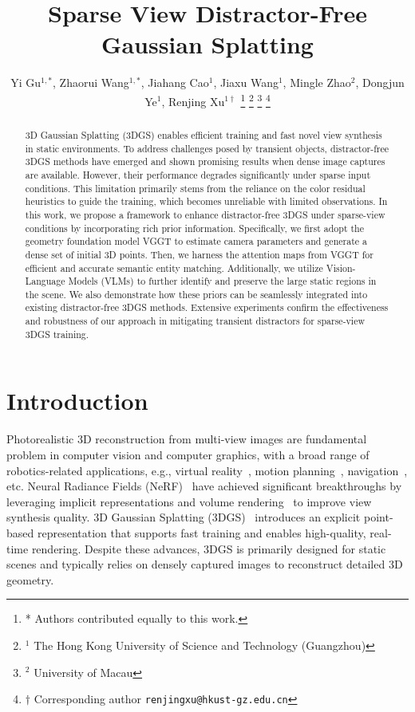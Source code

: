 \documentclass[letterpaper, 10 pt, conference]{ieeeconf}  %
\title{\LARGE \bf
Sparse View Distractor-Free Gaussian Splatting
}
\author{Yi Gu$^{1,*}$, Zhaorui Wang$^{1,*}$,  Jiahang Cao$^{1}$, Jiaxu Wang$^{1}$, Mingle Zhao$^{2}$, Dongjun Ye$^{1}$, Renjing Xu$^{1 \dagger}$ %
\thanks{* Authors contributed equally to this work.}%
\thanks{$^{1}$ The Hong Kong University of Science and Technology (Guangzhou)}%
\thanks{$^{2}$ University of Macau}%
\thanks{$\dagger$ Corresponding author
        {\tt\small renjingxu@hkust-gz.edu.cn}}%
}
\begin{document}
\maketitle
\thispagestyle{empty}
\pagestyle{empty}


\begin{abstract}
3D Gaussian Splatting (3DGS) enables efficient training and fast novel view synthesis in static environments. To address challenges posed by transient objects, distractor-free 3DGS methods have emerged and shown promising results when dense image captures are available. However, their performance degrades significantly under sparse input conditions. This limitation primarily stems from the reliance on the color residual heuristics to guide the training, which becomes unreliable with limited observations. In this work, we propose a framework to enhance distractor-free 3DGS under sparse-view conditions by incorporating rich prior information. Specifically, we first adopt the geometry foundation model VGGT to estimate camera parameters and generate a dense set of initial 3D points. Then, we harness the attention maps from VGGT for efficient and accurate semantic entity matching. Additionally, we utilize Vision-Language Models (VLMs) to further identify and preserve the large static regions in the scene. We also demonstrate how these priors can be seamlessly integrated into existing distractor-free 3DGS methods. Extensive experiments confirm the effectiveness and robustness of our approach in mitigating transient distractors for sparse-view 3DGS training.
\end{abstract}


\section{Introduction}
\label{introduction}


Photorealistic 3D reconstruction from multi-view images are fundamental problem in computer vision and computer graphics, with a broad range of robotics-related applications, e.g., virtual reality~\cite{zhu2025vr}, motion planning~\cite{xu2024hgs,liu2025physics,jin2024gs}, navigation~\cite{yamazaki2024open,jun2024renderable}, etc. Neural Radiance Fields (NeRF)~\cite{mildenhall2021nerf} have achieved significant breakthroughs by leveraging implicit representations and volume rendering~\cite{max2002optical} to improve view synthesis quality. 3D Gaussian Splatting (3DGS)~\cite{kerbl20233d} introduces an explicit point-based representation that supports fast training and enables high-quality, real-time rendering. Despite these advances, 3DGS is primarily designed for static scenes and typically relies on densely captured images to reconstruct detailed 3D geometry.
\end{document}
